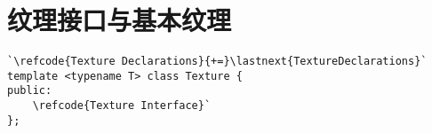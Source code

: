 \section{纹理接口与基本纹理}\label{sec:纹理接口与基本纹理}

\label{code:overview_Texture}
\begin{lstlisting}
`\refcode{Texture Declarations}{+=}\lastnext{TextureDeclarations}`
template <typename T> class Texture {
public:
    \refcode{Texture Interface}`
};
\end{lstlisting}